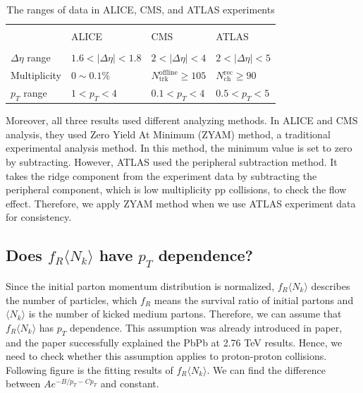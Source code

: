 \documentclass[jkps,fleqn,showpacs,showkeys]{revtex4}
\begin{document}
\begin{table}[ht]
  \centering
  \begin{tabular}{C{3cm} | C{3cm}  C{3cm}  C{3cm} } 
  \hline \\[-1 ex]
   & ALICE & CMS & ATLAS \\ [1 ex] \hline\hline \\[-1.5ex]
  $\Delta \eta $ range & $1.6<|\Delta \eta |<1.8$ & $2<|\Delta \eta |<4$ & $2<|\Delta \eta |<5$ \\ [1ex] 
  Multiplicity & $0\sim0.1\%$ & $N_{\text{trk}}^{\text{offline}} \geq 105$ & $N_{\text{ch}}^{\text{rec}} \geq 90$ \\[1ex] 
  $p_T$ range & $1<p_T<4$ & $0.1<p_T<4$ & $0.5<p_T<5$ \\[1 ex]
  \hline
 \end{tabular}
 \caption{The ranges of data in ALICE, CMS, and ATLAS experiments\cite{alice, cms, atlas}}
 \label{table:range}
\end{table}

Moreover, all three results used different analyzing methods.
In ALICE and CMS analysis, they used Zero Yield At Minimum (ZYAM) method, a traditional experimental analysis method.
In this method, the minimum value is set to zero by subtracting.
However, ATLAS used the peripheral subtraction method.
It takes the ridge component from the experiment data by subtracting the peripheral component, which is low multiplicity pp collisions, to check the flow effect.
Therefore, we apply ZYAM method when we use ATLAS experiment data for consistency.

\subsection{Does $f_R\langle N_k \rangle$ have $p_T$ dependence?}
\label{subsec: pT depnedence}

Since the initial parton momentum distribution is normalized, $f_R\langle N_k \rangle$ describes the number of particles, which $f_R$ means the survival ratio of initial partons and $\langle N_k \rangle$ is the number of kicked medium partons.
Therefore, we can assume that $f_R\langle N_k \rangle$ has $p_T$ dependence.
This assumption was already introduced in paper\cite{PbPb}, and the paper successfully explained the PbPb at 2.76 TeV results.
Hence, we need to check whether this assumption applies to proton-proton collisions.
Following figure is the fitting results of $f_R\langle N_k \rangle$.
We can find the difference between $Ae^{-{B} / p_T -C p_{T}}$ and constant.
\end{document}

